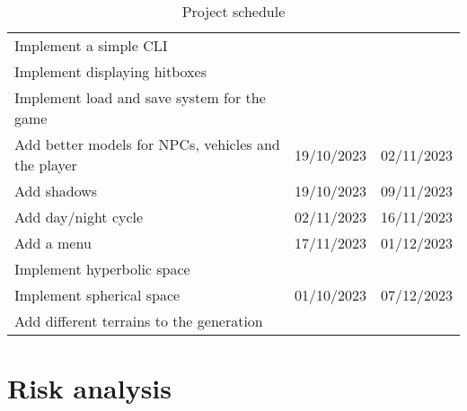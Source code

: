 \documentclass[12pt]{article}
\begin{document}
\begin{table}[H]
\begin{tabular}{lll}
        Implement a simple CLI                              &                              &                              \\
        Implement displaying hitboxes                       &                              &                              \\
        Implement load and save system for the game         &                              &                              \\ \hline
        Add better models for NPCs, vehicles and the player & 19/10/2023                   & 02/11/2023                   \\ \hline
        Add shadows                                         & 19/10/2023                   & 09/11/2023                   \\ \hline
        Add day/night cycle                                 & 02/11/2023                   & 16/11/2023                   \\ \hline
        Add a menu                                          & 17/11/2023                   & 01/12/2023                   \\ \hline
        Implement hyperbolic space                          & \multirow{3}{*}{01/10/2023}  & \multirow{3}{*}{07/12/2023}  \\
        Implement spherical space                           &                              &                              \\
        Add different terrains to the generation            &                              &                              \\ \hline
    \end{tabular}
    \caption{Project schedule}
\end{table}

\section{Risk analysis} %
\end{document}
